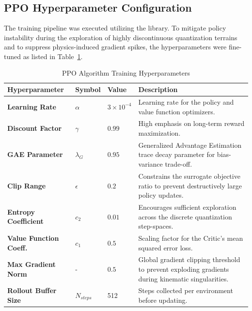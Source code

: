 \subsection{PPO Hyperparameter Configuration}
The training pipeline was executed utilizing the  library.
To mitigate policy instability during the exploration of highly discontinuous quantization terrains and to suppress physics-induced gradient spikes, the hyperparameters were fine-tuned as listed in Table~\ref{tab:ppo_hyperparams}.
\begin{table}[H]
  \centering
  \renewcommand{\arraystretch}{1.5} %
  \caption{PPO Algorithm Training Hyperparameters}
  \label{tab:ppo_hyperparams}
  \footnotesize
  \begin{tabularx}{\textwidth}{lllX}
    \toprule
    Hyperparameter & Symbol & Value & Description \\
    \midrule
    \textbf{Learning Rate} & $\alpha$ & $3 \times 10^{-4}$ & Learning rate for the policy and value function optimizers. \\
    
    \textbf{Discount Factor} & $\gamma$ & $0.99$ & High emphasis on long-term reward maximization. \\
    
    \textbf{GAE Parameter} & $\lambda_G$ & $0.95$ & Generalized Advantage Estimation trace decay parameter for bias-variance trade-off. \\
    
    \textbf{Clip Range} & $\epsilon$ & $0.2$ & Constrains the surrogate objective ratio to prevent destructively large policy updates. \\
    
    \textbf{Entropy Coefficient} & $c_2$ & $0.01$ & Encourages sufficient exploration across the discrete quantization step-spaces. \\
    
    \textbf{Value Function Coeff.} & $c_1$ & $0.5$ & Scaling factor for the Critic's mean squared error loss. \\
    
    \textbf{Max Gradient Norm} & - & $0.5$ & Global gradient clipping threshold to prevent exploding gradients during kinematic singularities. \\
    
    \textbf{Rollout Buffer Size} & $N_{steps}$ & 512 & Steps collected per environment before updating. \\
    

\end{tabularx}
\end{table}

